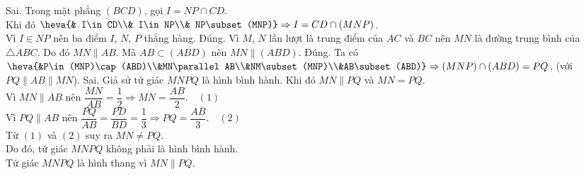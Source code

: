 \begin{ex}
{\begin{center}
  \end{center}
  \begin{itemchoice}
   \itemch Sai. Trong mặt phẳng  $(BCD)$, gọi $I=NP\cap CD$. \\
   Khi đó $\heva{& I\in CD\\& I\in  NP\\& NP\subset (MNP)}\Rightarrow I=CD\cap(MNP)$. \\
   Vì $I\in NP$ nên ba điểm $I$,  $N$, $P$ thẳng hàng.
   \itemch  Đúng. Vì $M$, $N$ lần lượt là trung điểm của $AC$ và $BC$ nên $MN$ là đường trung bình của $\triangle ABC$. Do đó $MN\parallel AB$. Mà $AB\subset(ABD)$ nên $MN\parallel (ABD)$.
   \itemch Đúng. Ta có $\heva{&P\in(MNP)\cap (ABD)\\&MN\parallel AB\\&NM\subset(MNP)\\&AB\subset (ABD)}\Rightarrow(MNP)\cap (ABD)=PQ$, (với $PQ\parallel AB\parallel  MN$).
   \itemch Sai. Giả sử  tứ giác $MNPQ$ là hình bình hành. Khi đó $MN\parallel PQ$ và $MN=PQ$.\\
   Vì $MN\parallel AB$ nên $\dfrac{MN}{AB}=\dfrac{1}{2}\Rightarrow MN=\dfrac{AB}{2}.\quad(1)$\\ 
   Vì $PQ\parallel AB$ nên $\dfrac{PQ}{AB}=\dfrac{PD}{BD}=\dfrac{1}{3}\Rightarrow PQ=\dfrac{AB}{3}.\quad(2)$\\ 
   Từ $(1)$  và $(2)$ suy ra $MN\ne PQ$.\\
   Do  đó, tứ giác $MNPQ$ không phải là hình bình hành.\\
   Tứ giác $MNPQ$ là hình thang vì $MN\parallel  PQ$.
  \end{itemchoice}
 } 
\end{ex}



